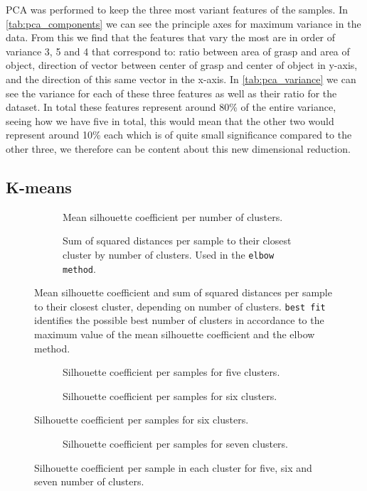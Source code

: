 PCA was performed to keep the three most variant features of the samples. In \ref{tab:pca_components} we can see the principle axes for maximum variance in the data. From this we find that the features that vary the most are in order of variance 3, 5 and 4 that correspond to: ratio between area of grasp and area of object, direction of vector between center of grasp and center of object in y-axis, and the direction of this same vector in the x-axis. In \ref{tab:pca_variance} we can see the variance for each of these three features as well as their ratio for the dataset. In total these features represent around 80\% of the entire variance, seeing how we have five in total, this would mean that the other two would represent around 10\% each which is of quite small significance compared to the other three, we therefore can be content about this new dimensional reduction.


\subsection{K-means}

\begin{figure}
	\begin{subfigure}[b]{\textwidth}
		
		\caption{Mean silhouette coefficient per number of clusters.}
	\end{subfigure}
	\begin{subfigure}[b]{\textwidth}
		
		\caption{Sum of squared distances per sample to their closest cluster by number of clusters. Used in the \texttt{elbow method}.}
	\end{subfigure}
	\caption{Mean silhouette coefficient and sum of squared distances per sample to their closest cluster, depending on number of clusters. \texttt{best fit} identifies the possible best number of clusters in accordance to the maximum value of the mean silhouette coefficient and the elbow method.}
	\label{fig:kmeans_score}
\end{figure}

\begin{figure}
	\begin{subfigure}[b]{\textwidth}
		
		\caption{Silhouette coefficient per samples for five clusters.}
	\end{subfigure}
	\begin{subfigure}[b]{\textwidth}
		
		\caption{Silhouette coefficient per samples for six clusters.}
		\label{fig:silhouette_6}
	\end{subfigure}
\end{figure}
\begin{figure}
	\ContinuedFloat
	\begin{subfigure}[b]{\textwidth}
		
		\caption{Silhouette coefficient per samples for seven clusters.}
	\end{subfigure}
	\caption{Silhouette coefficient per sample in each cluster for five, six and seven number of clusters.}
	\label{fig:silhouette_coef}
\end{figure}

